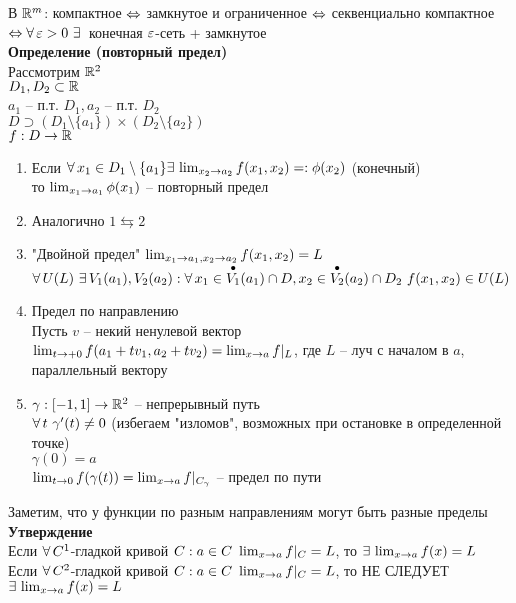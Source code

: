 \documentclass[12pt]{article}
\begin{document}
В $\mathbb{R}^m$: компактное $\Leftrightarrow$ замкнутое и ограниченное $\Leftrightarrow$ секвенциально компактное $\Leftrightarrow \forall\, \varepsilon > 0\ \exists\,$ конечная $\varepsilon$-сеть + замкнутое\\
\textbf{Определение (повторный предел)}\\
Рассмотрим $\mathbb{R}^2$\\
$D_1, D_2 \subset \mathbb{R}$\\
$a_1$ -- п.т. $D_1, a_2$ -- п.т. $D_2$\\
$D \supset (D_1 \setminus \{a_1\}) \times (D_2 \setminus \{a_2\})$\\
$f: D \rightarrow \mathbb{R}$\\
\begin{enumerate}
    \item Если $\forall\, x_1 \in D_1 \setminus \{a_1\} \exists\, \lim_{x_2\rightarrow a_2} f(x_1, x_2) =: \phi(x_2)$ (конечный)\\
    то $\lim_{x_1 \rightarrow a_1} \phi(x_1)$ -- повторный предел
    \item Аналогично $1 \leftrightarrows 2$\\
    \item "Двойной предел" $\lim_{x_1 \rightarrow a_1, x_2 \rightarrow a_2} f(x_1, x_2) = L$\\
    $\fall U(L)\ \ex V_1(a_1), V_2(a_2): \fall x_1 \in \overdot{V_1}(a_1) \cap D, x_2 \in \overdot{V_2}(a_2) \cap D_2\ f(x_1, x_2) \in U(L)$
    \item Предел по направлению\\
    Пусть $v$ -- некий ненулевой вектор\\
    $\lim_{t\rightarrow +0} f(a_1 + tv_1, a_2 + tv_2) = \lim_{x\rightarrow a} f|_L$, где $L$ -- луч с началом в $a$, параллельный вектору
    \item $\gamma: [-1, 1] \rightarrow \mathbb{R}^2$ -- непрерывный путь\\
    $\forall\, t\ \gamma'(t) \neq 0$ (избегаем "изломов", возможных при остановке в определенной точке)\\
    $\gamma(0) = a$\\
    $\lim_{t\rightarrow 0} f(\gamma(t)) = \lim_{x\rightarrow a} f|_{C_\gamma}$ -- предел по пути
\end{enumerate}
Заметим, что у функции по разным направлениям могут быть разные пределы\\
\textbf{Утверждение}\\
Если $\forall\, C^1$-гладкой кривой $C: a \in C\ \lim_{x\rightarrow a}f|_C = L$, то $\exists\, \lim_{x\rightarrow a} f(x) = L$\\
Если $\forall\, C^2$-гладкой кривой $C: a \in C\ \lim_{x\rightarrow a}f|_C = L$, то НЕ СЛЕДУЕТ $\exists\, \lim_{x\rightarrow a} f(x) = L$\\
\end{document}
